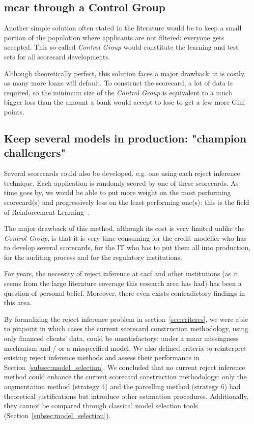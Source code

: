\subsection{\gls{mcar} through a Control Group}

Another simple solution often stated in the literature would be to keep a small portion of the population where applicants are not filtered: everyone gets accepted. This so-called \textit{Control Group} would constitute the learning and test sets for all scorecard developments.

Although theoretically perfect, this solution faces a major drawback: it is costly, as many more loans will default. To construct the scorecard, a lot of data is required, so the minimum size of the \textit{Control Group} is equivalent to a much bigger loss than the amount a bank would accept to lose to get a few more Gini points.

\subsection{Keep several models in production: "champion challengers"}

Several scorecards could also be developed, e.g. one using each {reject inference} technique. Each application is randomly scored by one of these scorecards. As time goes by, we would be able to put more weight on the most performing scorecard(s) and progressively less on the least performing one(s): this is the field of Reinforcement Learning~\cite{Sutton1998}.

The major drawback of this method, although its cost is very limited unlike the \textit{Control Group}, is that it is very time-consuming for the credit modeller who has to develop several scorecards, for the IT who has to put them all into production, for the auditing process and for the regulatory institutions.

\bigskip

For years, the necessity of {reject inference} at \gls{cacf} and other institutions (as it seems from the large literature coverage this research area has had) has been a question of personal belief. Moreover, there even exists contradictory findings in this area.

By formalizing the {reject inference} problem in section~\ref{sec:criteres}, we were able to pinpoint in which cases the current scorecard construction methodology, using only financed clients' data, could be unsatisfactory: under a \gls{mnar} missingness mechanism and / or a misspecified model. We also defined criteria to reinterpret existing {reject inference} methods and assess their performance in Section~\ref{subsec:model_selection}. We concluded that no current {reject inference} method could enhance the current scorecard construction methodology: only the augmentation method (strategy 4) and the parcelling method (strategy 6) had theoretical justifications but introduce other estimation procedures. Additionally, they cannot be compared through classical model selection tools (Section~\ref{subsec:model_selection}).

